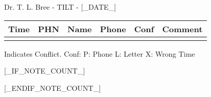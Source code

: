 \documentclass[12pt]{article}
\newenvironment{my_enumerate}{
\begin{enumerate}
  \setlength{\itemsep}{1pt}
  \setlength{\parskip}{0pt}
  \setlength{\parsep}{0pt}}{\end{enumerate}
}
\begin{document}
\begin{center}
{\Large Dr. T. L. Bree - TILT - [_DATE_]} \\[.5pc]
\end{center}


\footnotesize
\vspace{0.12in}

\begin{center}
\begin{tabular}{rllrll}
\textbf{Time} & \textbf{PHN} & \textbf{Name} & \textbf{Phone} & \textbf{Conf} & \textbf{Comment} \\
\midrule
[_CONTENTS_]
\bottomrule
\vspace{-0.40in}
\end{tabular}
\end{center}

\begin{center}
{\scriptsize * Indicates Conflict.  Conf: P: Phone L: Letter X: Wrong Time}
\end{center}


[_IF_NOTE_COUNT_]
\begin{my_enumerate}
[_NOTES_]
\end{my_enumerate}
[_ENDIF_NOTE_COUNT_]
\end{document}
